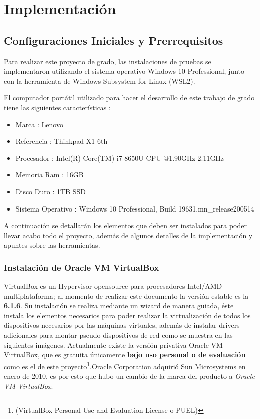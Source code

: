 \documentclass[letterpaper, 12pt, oneside]{article}
\begin{document}
    \section{Implementación}
    \subsection{Configuraciones Iniciales y Prerrequisitos}
    Para realizar este proyecto de grado, las instalaciones de pruebas se implementaron utilizando el sistema operativo Windows 10 Professional, junto con la herramienta de Windows Subsystem for Linux (WSL2).
    
    El computador portátil utilizado para hacer el desarrollo de este trabajo de grado tiene las siguientes características : 
    \begin{itemize}
        \item Marca : Lenovo
        \item Referencia : Thinkpad X1 6th
        \item Procesador : Intel(R) Core(TM) i7-8650U CPU @1.90GHz 2.11GHz 
        \item Memoria Ram : 16GB
        \item Disco Duro : 1TB SSD 
        \item Sistema Operativo : Windows 10 Professional, Build 19631.mn\_release200514
    \end{itemize}
    
    A continuación se detallarán los elementos que deben ser instalados para poder llevar acabo todo el proyecto, además de algunos detalles de la implementación y apuntes sobre las herramientas.
    
    \subsubsection{Instalación de Oracle VM VirtualBox}
    VirtualBox es un Hypervisor opensource para procesadores Intel/AMD multiplataforma; al momento de realizar este documento la versión estable es la \textbf{6.1.6}. Su instalación se realiza mediante un wizard de manera guiada, éste instala los elementos necesarios para poder realizar la virtualización de todos los dispositivos necesarios por las máquinas virtuales, además de instalar drivers adicionales para montar pseudo dispositivos de red como se muestra en las siguientes imágenes. 
    Actualmente existe la versión privativa Oracle VM VirtualBox, que es gratuita únicamente \textbf{bajo uso personal o de evaluación} como es el de este proyecto\footnote{(VirtualBox Personal Use and Evaluation License o PUEL)}.Oracle Corporation adquirió Sun Microsystems en enero de 2010, es por esto que hubo un cambio de la marca del producto a \textit{Oracle VM VirtualBox}\cite{oracle}.
    
\end{document}
